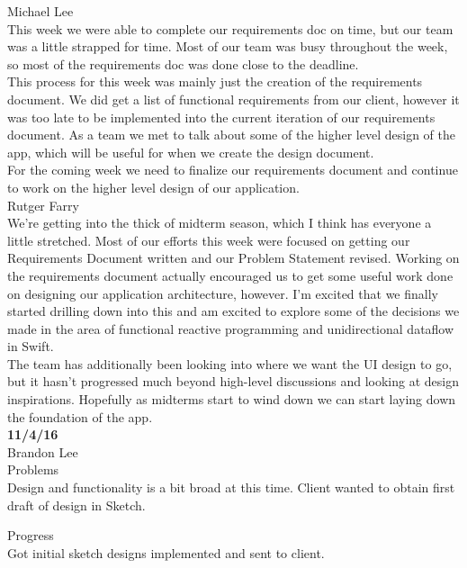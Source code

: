 \documentclass[letterpaper,10pt,titlepage]{article}
\begin{document}
Michael Lee\\

This week we were able to complete our requirements doc on time, but our team was a little strapped for time. Most of our team was busy throughout the week, so most of the requirements doc was done close to the deadline.\\

This process for this week was mainly just the creation of the requirements document. We did get a list of functional requirements from our client, however it was too late to be implemented into the current iteration of our requirements document. As a team we met to talk about some of the higher level design of the app, which will be useful for when we create the design document.\\

For the coming week we need to finalize our requirements document and continue to work on the higher level design of our application.\\

Rutger Farry\\

We're getting into the thick of midterm season, which I think has everyone a little stretched. Most of our efforts this week were focused on getting our Requirements Document written and our Problem Statement revised. Working on the requirements document actually encouraged us to get some useful work done on designing our application architecture, however. I'm excited that we finally started drilling down into this and am excited to explore some of the decisions we made in the area of functional reactive programming and unidirectional dataflow in Swift.\\

The team has additionally been looking into where we want the UI design to go, but it hasn't progressed much beyond high-level discussions and looking at design inspirations. Hopefully as midterms start to wind down we can start laying down the foundation of the app.\\

\textbf{11/4/16}\\

Brandon Lee\\

Problems\\
Design and functionality is a bit broad at this time.
Client wanted to obtain first draft of design in Sketch.

Progress\\
Got initial sketch designs implemented and sent to client.\\
\end{document}

